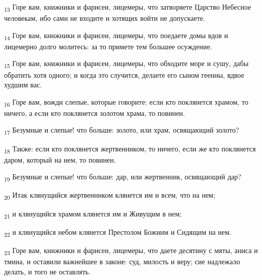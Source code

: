 \begin{tcolorbox}
\textsubscript{13} Горе вам, книжники и фарисеи, лицемеры, что затворяете Царство Небесное человекам, ибо сами не входите и хотящих войти не допускаете.
\end{tcolorbox}
\begin{tcolorbox}
\textsubscript{14} Горе вам, книжники и фарисеи, лицемеры, что поедаете домы вдов и лицемерно долго молитесь: за то примете тем большее осуждение.
\end{tcolorbox}
\begin{tcolorbox}
\textsubscript{15} Горе вам, книжники и фарисеи, лицемеры, что обходите море и сушу, дабы обратить хотя одного; и когда это случится, делаете его сыном геенны, вдвое худшим вас.
\end{tcolorbox}
\begin{tcolorbox}
\textsubscript{16} Горе вам, вожди слепые, которые говорите: если кто поклянется храмом, то ничего, а если кто поклянется золотом храма, то повинен.
\end{tcolorbox}
\begin{tcolorbox}
\textsubscript{17} Безумные и слепые! что больше: золото, или храм, освящающий золото?
\end{tcolorbox}
\begin{tcolorbox}
\textsubscript{18} Также: если кто поклянется жертвенником, то ничего, если же кто поклянется даром, который на нем, то повинен.
\end{tcolorbox}
\begin{tcolorbox}
\textsubscript{19} Безумные и слепые! что больше: дар, или жертвенник, освящающий дар?
\end{tcolorbox}
\begin{tcolorbox}
\textsubscript{20} Итак клянущийся жертвенником клянется им и всем, что на нем;
\end{tcolorbox}
\begin{tcolorbox}
\textsubscript{21} и клянущийся храмом клянется им и Живущим в нем;
\end{tcolorbox}
\begin{tcolorbox}
\textsubscript{22} и клянущийся небом клянется Престолом Божиим и Сидящим на нем.
\end{tcolorbox}
\begin{tcolorbox}
\textsubscript{23} Горе вам, книжники и фарисеи, лицемеры, что даете десятину с мяты, аниса и тмина, и оставили важнейшее в законе: суд, милость и веру; сие надлежало делать, и того не оставлять.
\end{tcolorbox}
